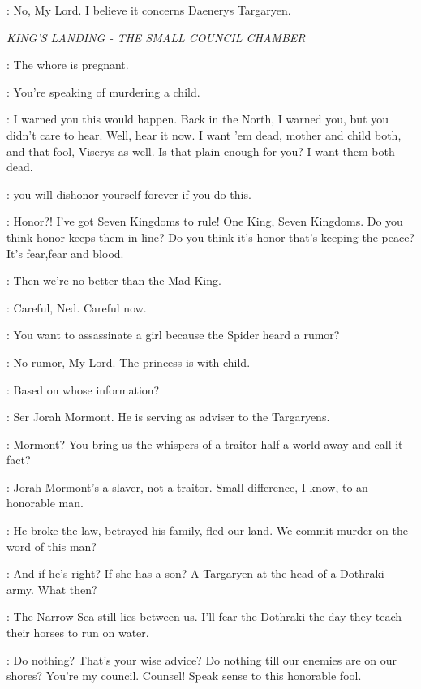 \STEWARD: No, My Lord. I believe it concerns Daenerys Targaryen. 


\scene

\textit{KING'S LANDING - THE SMALL COUNCIL CHAMBER} 


\ROBERT: The whore is pregnant. 

\NED: You're speaking of murdering a child. 

\ROBERT: I warned you this would happen. Back in the North, I warned you, but you didn't care to hear. Well, hear it now. I want 'em dead, mother and child both, and that fool, Viserys as well. Is that plain enough for you? I want them both dead. 

\NED: you will dishonor yourself forever if you do this. 

\ROBERT: Honor?! I've got Seven Kingdoms to rule! One King, Seven Kingdoms. Do you think honor keeps them in line? Do you think it's honor that's keeping the peace? It's fear,fear and blood. 

\NED: Then we're no better than the Mad King. 

\ROBERT: Careful, Ned. Careful now. 

\NED: You want to assassinate a girl because the Spider heard a rumor? 

\VARYS: No rumor, My Lord. The princess is with child. 

\NED: Based on whose information? 

\VARYS: Ser Jorah Mormont. He is serving as adviser to the Targaryens. 

\NED: Mormont? You bring us the whispers of a traitor half a world away and call it fact? 

\LITTLEFINGER: Jorah Mormont's a slaver, not a traitor. Small difference, I know, to an honorable man. 

\NED: He broke the law, betrayed his family, fled our land. We commit murder on the word of this man? 

\ROBERT: And if he's right? If she has a son? A Targaryen at the head of a Dothraki army. What then? 

\NED: The Narrow Sea still lies between us. I'll fear the Dothraki the day they teach their horses to run on water. 

\ROBERT: Do nothing? That's your wise advice? Do nothing till our enemies are on our shores? You're my council. Counsel! Speak sense to this honorable fool. 

